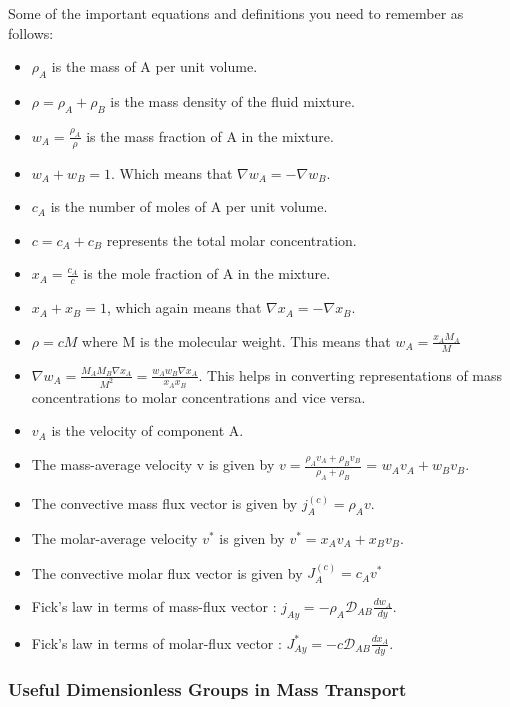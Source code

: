 Some of the important equations and definitions you need to remember as follows:

\begin{itemize}
    \item $\rho_{A}$ is the mass of A per unit volume.
    \item $\rho = \rho_{A} + \rho_{B}$ is the mass density of the fluid mixture.
    \item $w_{A} = \frac{\rho_{A}}{\rho}$ is the mass fraction of A in the mixture.
    \item $w_{A} + w_{B} = 1$. Which means that $\nabla w_{A} = - \nabla w_{B}$.
    \item $c_{A}$ is the number of moles of A per unit volume.
    \item $c = c_{A} + c_{B}$ represents the total molar concentration.
    \item $x_{A} = \frac{c_{A}}{c}$ is the mole fraction of A in the mixture.
    \item $x_{A} + x_{B} = 1$, which again means that $\nabla x_{A} = - \nabla x_{B}$.
    \item $\rho = cM$ where M is the molecular weight. This means that $w_{A} = \frac{x_{A} M_{A}}{M}$
    \item $\nabla w_{A} = \frac{M_{A} M_{B} \nabla x_{A}}{M^{2}} = \frac{w_{A} w_{B} \nabla x_{A}}{x_{A} x_{B}}$. This helps in converting representations of mass concentrations to molar concentrations and vice versa. 
    \item $v_{A}$ is the velocity of component A.
    \item The mass-average velocity v is given by $v = \frac{\rho_{A} v_{A} + \rho_{B} v_{B}}{\rho_{A} + \rho_{B}}$ = $w_{A} v_{A} + w_{B} v_{B}$.
    \item The convective mass flux vector is given by $j_{A}^{(c)} = \rho_{A} v$.
    \item The molar-average velocity $v^{*}$ is given by $v^{*} = x_{A} v_{A} + x_{B} v_{B}$.
    \item The convective molar flux vector is given by $J_{A}^{(c)} = c_{A} v^{*}$
    \item Fick's law in terms of mass-flux vector : $j_{Ay} = -\rho_{A} \mathscr{D}_{AB} \frac{dw_{A}}{dy}$.
    \item Fick's law in terms of molar-flux vector : $J_{Ay}^{*} = -c \mathscr{D}_{AB} \frac{dx_{A}}{dy}$.
\end{itemize}

\subsubsection*{Useful Dimensionless Groups in Mass Transport}

